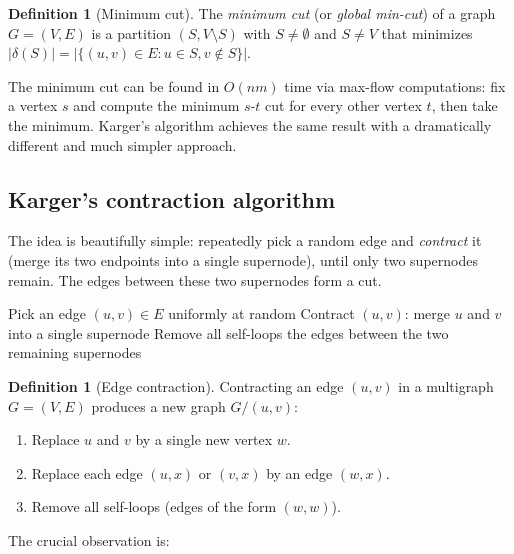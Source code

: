 \documentclass[twoside,12pt]{book}
\theoremstyle{plain}
\theoremstyle{definition}
\newtheorem{definition}[theorem]{Definition}
\theoremstyle{remark}
\begin{document}
\begin{definition}[Minimum cut]
The \emph{minimum cut} (or \emph{global min-cut}) of a graph $G = (V, E)$ is a partition $(S, V \setminus S)$ with $S \neq \emptyset$ and $S \neq V$ that minimizes $|\delta(S)| = |\{(u,v) \in E : u \in S, v \notin S\}|$.
\end{definition}

The minimum cut can be found in $O(nm)$ time via max-flow computations: fix a vertex $s$ and compute the minimum $s$-$t$ cut for every other vertex $t$, then take the minimum. Karger's algorithm achieves the same result with a dramatically different and much simpler approach.

\subsection{Karger's contraction algorithm}

The idea is beautifully simple: repeatedly pick a random edge and \emph{contract} it (merge its two endpoints into a single supernode), until only two supernodes remain. The edges between these two supernodes form a cut.

\begin{algorithm}
\caption{Karger's Contraction Algorithm}
\label{alg:karger}
\begin{algorithmic}[1]
        \State Pick an edge $(u, v) \in E$ uniformly at random
        \State Contract $(u, v)$: merge $u$ and $v$ into a single supernode
        \State Remove all self-loops
    \EndWhile
    \State \Return the edges between the two remaining supernodes
\EndFunction
\end{algorithmic}
\end{algorithm}

\begin{definition}[Edge contraction]
Contracting an edge $(u, v)$ in a multigraph $G = (V, E)$ produces a new graph $G / (u,v)$:
\begin{enumerate}[nosep]
    \item Replace $u$ and $v$ by a single new vertex $w$.
    \item Replace each edge $(u, x)$ or $(v, x)$ by an edge $(w, x)$.
    \item Remove all self-loops (edges of the form $(w, w)$).
\end{enumerate}
\end{definition}

The crucial observation is:
\end{document}
